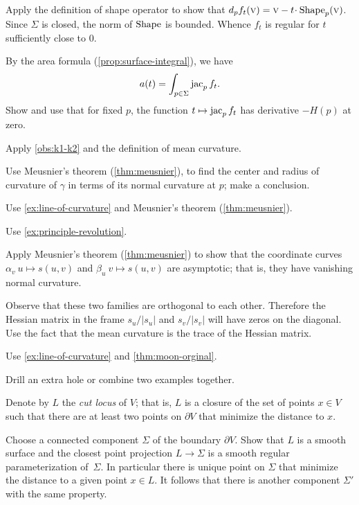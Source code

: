 Apply the definition of shape operator to show that $d_pf_t(\vec v)=\vec v-t\cdot\Shape_p(\vec v)$.
Since $\Sigma$ is closed, the norm of $\mathop{\rm Shape}\nolimits$ is bounded.
Whence $f_t$ is regular for $t$ sufficiently close to $ 0$.

 By the area formula (\ref{prop:surface-integral}), we have
\[a(t)=\int_{p\in \Sigma}\mathop{\rm jac}\nolimits_pf_t.\]
Show and use that for fixed $p$, the function $t\mapsto \mathop{\rm jac}\nolimits_pf_t$ has derivative $-H(p)$ at zero.

Apply \ref{obs:k1-k2} and the definition of mean curvature.

 Use Meusnier's theorem (\ref{thm:meusnier}), to find the center and radius of curvature of $\gamma$ in terms of its normal curvature at $p$;
make a conclusion.

Use \ref{ex:line-of-curvature} and Meusnier's theorem (\ref{thm:meusnier}).

 Use \ref{ex:principle-revolution}.

 Apply Meusnier's theorem (\ref{thm:meusnier}) to show that the coordinate curves $\alpha_v\:u\mapsto s(u,v)$ and $\beta_u\:v\mapsto s(u,v)$ are asymptotic; that is, they have vanishing normal curvature.

Observe that these two families are orthogonal to each other.
Therefore the Hessian matrix in the frame $s_u/|s_u|$ and $s_v/|s_v|$ will have zeros on the diagonal.
Use the fact that the mean curvature is the trace of the Hessian matrix.

 Use \ref{ex:line-of-curvature} and \ref{thm:moon-orginal}.

 Drill an extra hole or combine two examples together.

Denote by $L$ the \emph{cut locus} of $V$;
that is, $L$ is a closure of the set of points $x\in V$ such that there are at least two points on $\partial V$ that minimize the distance to $x$.

Choose a connected component $\Sigma$ of the boundary $\partial V$.
Show that $L$ is a smooth surface and the closest point projection $L\to \Sigma$ is a smooth regular parameterization of~$\Sigma$.
In particular there is unique point on $\Sigma$ that minimize the distance to a given point $x\in L$.
It follows that there is another component $\Sigma'$ with the same property.

